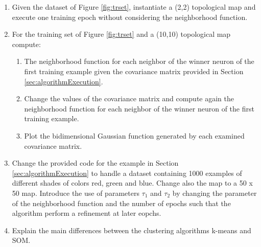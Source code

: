 \begin{enumerate}
    \item Given the dataset of Figure \ref{fig:trset}, instantiate a (2,2) topological map and execute one training epoch without considering the neighborhood function.
    \item For the training set of Figure \ref{fig:trset} and a (10,10) topological map compute:
    \begin{enumerate}
        \item The neighborhood function for each neighbor of the winner neuron of the first training example given the covariance matrix provided in Section \ref{sec:algorithmExecution}. 
        \item Change the values of the covariance matrix and compute again the neighborhood function for each neighbor of the winner neuron of the first training example.
        \item Plot the bidimensional Gaussian function generated by each examined covariance matrix. 
    \end{enumerate}
    \item Change the provided code for the example in Section \ref{sec:algorithmExecution} to handle a dataset containing 1000 examples of different shades of colors red, green and blue. Change also the map to a 50 x 50 map. Introduce the use of parameters $\tau_1$ and $\tau_2$ by changing the parameter of the neighborhood function and the number of epochs such that the algorithm perform a refinement at later eopchs. 
    \item Explain the main differences between the clustering algorithms k-means and SOM.
    
\end{enumerate}




